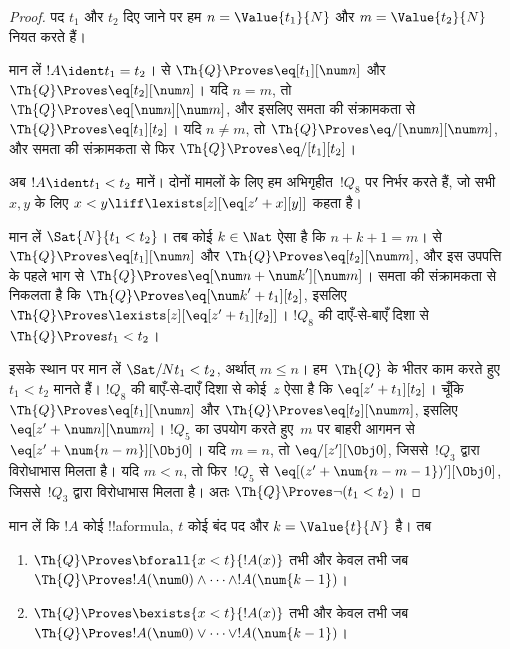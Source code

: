 \documentclass[../../../include/open-logic-section]{subfiles}
\begin{document}
\begin{proof}
पद $t_1$ और $t_2$ दिए जाने पर हम $n = \Value{t_1}{N}$ और
$m = \Value{t_2}{N}$ नियत करते हैं।

मान लें $!A \ident t_1 = t_2$।  से
$\Th{Q} \Proves \eq[t_1][\num n]$ और
$\Th{Q} \Proves \eq[t_2][\num n]$। यदि $n = m$, तो
$\Th{Q} \Proves \eq[\num n][\num m]$, और इसलिए समता की संक्रामकता से
$\Th{Q} \Proves \eq[t_1][t_2]$। यदि $n \neq m$, तो
$\Th{Q} \Proves \eq/[\num n][\num m]$, और समता की संक्रामकता से फिर
$\Th{Q} \Proves \eq/[t_1][t_2]$।

अब $!A \ident t_1 < t_2$ मानें। दोनों मामलों के लिए हम अभिगृहीत~$!Q_8$
पर निर्भर करते हैं, जो सभी $x,y$ के लिए
$x < y \liff \lexists[z][\eq[z' + x][y]]$ कहता है।

मान लें $\Sat{N}{t_1 < t_2}$। तब कोई $k \in \Nat$ ऐसा है कि
$n + k + 1 = m$।  से
$\Th{Q} \Proves \eq[t_1][\num n]$ और
$\Th{Q} \Proves \eq[t_2][\num m]$, और इस उपपत्ति के पहले भाग से
$\Th{Q} \Proves \eq[\num n + {\num k}'][\num m]$। समता की संक्रामकता
से निकलता है कि $\Th{Q} \Proves \eq[{\num k}' + t_1][t_2]$, इसलिए
$\Th{Q} \Proves \lexists[z][\eq[z' + t_1][t_2]]$। $!Q_8$ की
दाएँ-से-बाएँ दिशा से $\Th{Q} \Proves t_1 < t_2$।

इसके स्थान पर मान लें $\Sat/{N}{t_1 < t_2}$, अर्थात् $m \leq n$।
%
हम~$\Th{Q}$ के भीतर काम करते हुए $t_1 < t_2$ मानते हैं। $!Q_8$ की
बाएँ-से-दाएँ दिशा से कोई~$z$ ऐसा है कि $\eq[z' + t_1][t_2]$। चूँकि
$\Th{Q} \Proves \eq[t_1][\num n]$ और
$\Th{Q} \Proves \eq[t_2][\num m]$, इसलिए
$\eq[z' + \num n][\num m]$।
%
$!Q_5$ का उपयोग करते हुए~$m$ पर बाहरी आगमन से
$\eq[z' + \num{n - m}][\Obj 0]$। यदि $m = n$, तो
$\eq/[z'][\Obj 0]$, जिससे~$!Q_3$ द्वारा विरोधाभास मिलता है। यदि $m < n$,
तो फिर~$!Q_5$ से $\eq[(z' + \num{n - m - 1})'][\Obj 0]$, जिससे~$!Q_3$
द्वारा विरोधाभास मिलता है। अतः $\Th{Q} \Proves \lnot(t_1 < t_2)$।
\end{proof}

\begin{lem}
मान लें कि $!A$ कोई !!a{formula}, $t$ कोई बंद पद और $k=\Value{t}{N}$ है।
तब
\begin{enumerate}
\item $\Th{Q} \Proves \bforall{x<t}{!A(x)}$ तभी और केवल तभी जब
    $\Th{Q} \Proves !A(\num 0) \land \dots \land !A(\num{k-1})$।
\item $\Th{Q} \Proves \bexists{x<t}{!A(x)}$ तभी और केवल तभी जब
    $\Th{Q} \Proves !A(\num 0) \lor \dots \lor !A(\num{k-1})$।
\end{enumerate}
\end{lem}
\end{document}
